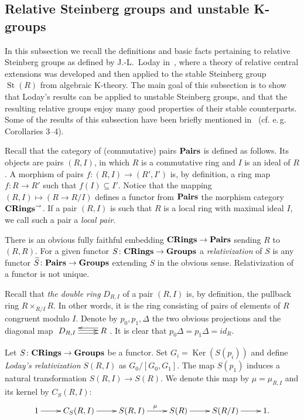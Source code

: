 \documentclass[oneside, 8pt]{amsart}
\theoremstyle{remark}
\theoremstyle{definition}
\numberwithin{lemma}{section}
\numberwithin{prop}{section}
\numberwithin{corollary}{section}
\DeclareMathOperator{\Ker}{Ker}
\DeclareMathOperator{\St}{St}
\newcommand{\catname}[1]{{\normalfont\textbf{#1}}} %
\numberwithin{equation}{section}
\begin{document}
\subsection{Relative Steinberg groups and unstable K-groups} \label{sec:quillen}
In this subsection we recall the definitions and basic facts pertaining to relative Steinberg groups as defined by J.-L.~Loday in~\cite{Lo78}, where a theory of relative central extensions was developed and then applied to the stable Steinberg group $\St(R)$ from algebraic K-theory. The main goal of this subsection is to show that Loday's results can be applied to unstable Steinberg groups, and that the resulting relative groups enjoy many good properties of their stable counterparts.
Some of the results of this subsection have been briefly mentioned in~\cite{S15} (cf. e.\,g. Corollaries 3--4).

Recall that the category of (commutative) pairs $\catname{Pairs}$ is defined as follows.
Its objects are pairs $(R, I)$, in which $R$ is a commutative ring and $I$ is an ideal of $R$. A morphism of pairs $f \colon (R, I) \to (R', I')$ is, by definition, a ring map $f \colon R \to R'$ such that $f(I) \subseteq I'$. Notice that the mapping $(R, I) \mapsto (R \to R/I)$ defines a functor from $\catname{Pairs}$ the morphism category $\catname{CRings}^\rightarrow$.
If a pair $(R, I)$ is such that $R$ is a local ring with maximal ideal $I$, we call such a pair a {\it local pair}.

There is an obvious fully faithful embedding $\catname{CRings} \to \catname{Pairs}$ sending $R$ to $(R, R)$. For a given functor $S \colon \catname{CRings} \to \catname{Groups}$ a {\it relativization} of $S$ is any functor $\widetilde{S} \colon \catname{Pairs} \to \catname{Groups}$ extending $S$ in the obvious sense. Relativization of a functor is not unique.

Recall that {\it the double ring} $D_{R, I}$ of a pair $(R, I)$ is, by definition, the pullback ring $R \times_{R/I} R$. In other words, it is the ring consisting of pairs of elements of $R$ congruent modulo $I$. Denote by $p_0, p_1, \Delta$ the two obvious projections and the diagonal map $\xymatrix{D_{R,I} \ar@<1pt>[r] \ar@<-2.5pt>[r] & \ar@<-4pt>[l] R}$. It is clear that $p_0 \Delta = p_1 \Delta = id_{R}$.

Let $S \colon \catname{CRings} \to \catname{Groups}$ be a functor. Set $G_i = \Ker(S(p_i))$ and define {\it Loday's relativization} $S(R, I)$ as $ G_0 / [G_0, G_1]$. The map $S(p_1)$ induces a natural transformation $S(R, I) \to S(R)$. We denote this map by $\mu = \mu_{R,I}$ and its kernel by $C_S(R, I)$: \begin{equation} \label{LodayRelativization} \xymatrix{ 1 \ar[r] & C_S(R, I) \ar[r] & S(R, I) \ar^{\mu}[r] & S(R) \ar[r] & S(R/I) \ar[r] & 1.} \end{equation}
\end{document}
